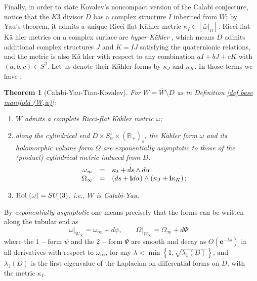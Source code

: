 \documentclass{article}
\newcommand{\func}[1]{\textnormal {#1\,}}
\newcommand{\e}[1]{\mathbf{e}^{#1}}
\newtheorem{theorem}{Theorem}
\begin{document}
\label{Subsec Noncompact CY}
Finally, in order to state Kovalev's noncompact version of the Calabi
conjecture, notice that the $K3$ divisor $D$ has a complex
structure $I$ inherited from $\bar{W}$; by Yau's theorem, it admits a unique
Ricci-flat K\"{a}hler metric  $\kappa _{I}\in\left[\left. \bar{\omega}%
\right\vert _{D}\right]$. Ricci-flat  K\"{a}%
hler metrics on a complex surface%
 are \emph{hyper-K\"{a}hler} \cite[pp.336-338]{BHPV}, which means $D$ admits
additional complex structures $J$ and $K=IJ$ satisfying the quaternionic
relations, and the metric is also K\"{a}%
hler with respect to any combination $aI+bJ+cK$ with $\left( a,b,c\right)
\in S^{2}$. Let us denote their K\"{a}hler forms by $%
\kappa _{J}$ and $\kappa _{K}$. In those terms we have  \cite[Theorem 2.2]{kovalevzinho}:
\begin{theorem}[Calabi-Yau-Tian-Kovalev]         \label{Thm SU(3) mfds}
For $W=\bar{W}\setminus D$ as in \emph{Definition \ref{def base manifold (W,w)}}: 
\begin{enumerate}
        \item
        $W$ admits a complete Ricci-flat K\"{a}hler metric $\omega $;
        \item
        along the cylindrical end $D\times S_{\alpha }^{1}\times 
        \left(\mathbb{R}_{+}\right) _{s}$, the K\"{a}hler form $\omega $
         and its holomorphic volume form $\Omega $ are 
        \emph{exponentially asymptotic} to those of the (product) cylindrical metric induced from $D$:%
        \begin{eqnarray}
        \begin{array}{r c l}      \label{asymptotic forms}
                \omega _{\infty } &=&\kappa _{I}+ds\wedge d\alpha \\
                \Omega _{\infty } &=&\left( ds+\mathbf{i}d\alpha \right)                 \wedge \left(\kappa _{J}+\mathbf{i}\kappa _{K}\right) \text{;}
        \end{array}
        \end{eqnarray}
        \item
        $\func{Hol}\left( \omega \right) =SU\left( 3\right) $, i.e., 
        $W$ is Calabi-Yau.
\end{enumerate}
\end{theorem}
By \emph{exponentially asymptotic} one means precisely that the forms can be written along the tubular end as
\begin{displaymath}
        \left.\omega \right\vert_{W_{\infty}}
        =\omega _{\infty }+d\psi, \qquad
        \left.\Omega \right \vert_{W_\infty}
        =\Omega _{\infty }+d\Psi 
\end{displaymath}%
where the $1-$form $\psi $ and the $2-$form $\Psi $ are smooth 
and decay as $O\left( \e{-\lambda s}\right) $ in all derivatives with respect
to $\omega _{\infty }$, for any $\lambda <\min \left\{ 1,
\sqrt{\lambda_{1}\left( D\right) }\right\} $, and 
$\lambda _{1}\left( D\right) $ is the first eigenvalue of the Laplacian
on differential forms on $D$, with the metric $\kappa _{I}$.
\end{document}
